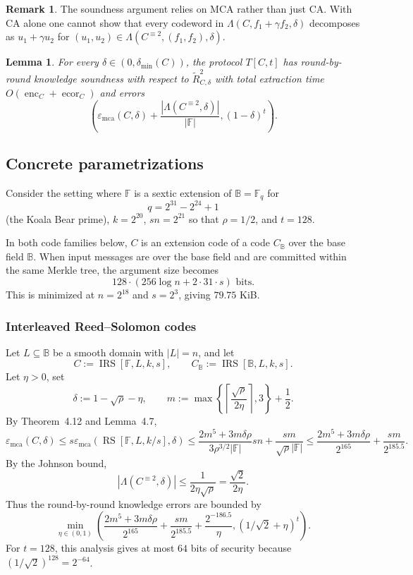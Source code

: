 \documentclass[11pt]{article}
\theoremstyle{plain}
\newtheorem{lemma}[theorem]{Lemma}
\theoremstyle{definition}
\newtheorem{remark}[theorem]{Remark}
\newcommand{\F}{\mathbb{F}}
\newcommand{\B}{\mathbb{B}}
\newcommand{\RS}[3]{\operatorname{RS}[#1,#2,#3]}
\newcommand{\IRS}[4]{\operatorname{IRS}[#1,#2,#3,#4]}
\newcommand{\epsmca}{\varepsilon_{\mathrm{mca}}}
\newcommand{\distmin}{\delta_{\min}}
\newcommand{\abs}[1]{\left|#1\right|}
\DeclareMathOperator{\enc}{enc}
\DeclareMathOperator{\ecor}{ecor}
\begin{document}
\begin{remark}
The soundness argument relies on MCA rather than just CA. With CA alone one cannot show that every codeword in $\Lambda(C,f_1+\gamma f_2,\delta)$ decomposes as $u_1+\gamma u_2$ for $(u_1,u_2)\in\Lambda(C^{\equiv2},(f_1,f_2),\delta)$.
\end{remark}

\begin{lemma}
For every $\delta\in(0,\distmin(C))$, the protocol $T[C,t]$ has round-by-round knowledge soundness with respect to $\widetilde R_{C,\delta}^2$ with total extraction time $O(\enc_C+\ecor_C)$ and errors
\[
\left(
\epsmca(C,\delta)+\frac{\abs{\Lambda(C^{\equiv2},\delta)}}{\abs{\F}},
(1-\delta)^t
\right).
\]
\end{lemma}

\subsection{Concrete parametrizations}

Consider the setting where $\F$ is a sextic extension of $\B=\F_q$ for
\[
  q=2^{31}-2^{24}+1
\]
(the Koala Bear prime), $k=2^{20}$, $sn=2^{21}$ so that $\rho=1/2$, and $t=128$.

In both code families below, $C$ is an extension code of a code $C_\B$ over the base field $\B$. When input messages are over the base field and are committed within the same Merkle tree, the argument size becomes
\[
  128\cdot(256\log n+2\cdot31\cdot s)\text{ bits}.
\]
This is minimized at $n=2^{18}$ and $s=2^3$, giving $79.75$ KiB.

\subsubsection{Interleaved Reed--Solomon codes}

Let $L\subseteq\B$ be a smooth domain with $\abs{L}=n$, and let
\[
  C:=\IRS{\F}{L}{k}{s},\qquad C_\B:=\IRS{\B}{L}{k}{s}.
\]
Let $\eta>0$, set
\[
  \delta:=1-\sqrt\rho-\eta,
  \qquad
  m:=\max\left\{\left\lceil\frac{\sqrt\rho}{2\eta}\right\rceil,3\right\}+\frac12.
\]
By Theorem~4.12 and Lemma~4.7,
\[
\epsmca(C,\delta)
\le s\epsmca(\RS{\F}{L}{k/s},\delta)
\le
\frac{2m^5+3m\delta\rho}{3\rho^{3/2}\abs{\F}}sn
+\frac{sm}{\sqrt\rho\abs{\F}}
\le
\frac{2m^5+3m\delta\rho}{2^{165}}+\frac{sm}{2^{185.5}}.
\]
By the Johnson bound,
\[
  \abs{\Lambda(C^{\equiv2},\delta)}\le \frac{1}{2\eta\sqrt\rho}=\frac{\sqrt2}{2\eta}.
\]
Thus the round-by-round knowledge errors are bounded by
\[
\min_{\eta\in(0,1)}\left(
\frac{2m^5+3m\delta\rho}{2^{165}}+\frac{sm}{2^{185.5}}+\frac{2^{-186.5}}{\eta},
(1/\sqrt2+\eta)^t
\right).
\]
For $t=128$, this analysis gives at most $64$ bits of security because $(1/\sqrt2)^128=2^{-64}$.
\end{document}
